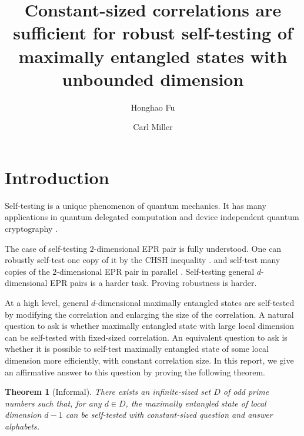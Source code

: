 \documentclass[11pt,letterpaper]{article}
\newcommand{\1}{\mathbb{1}}
\newtheorem{theorem}{Theorem}[section]
\theoremstyle{definition}
\begin{document}
\title{Constant-sized correlations are sufficient for 
robust self-testing of maximally entangled states with unbounded dimension}

\author[1]{Honghao Fu}
\author[1,2]{Carl Miller}

\renewcommand\Affilfont{\itshape\small}



\maketitle

\section{Introduction}
\label{sec:intro}
Self-testing is a unique phenomenon of quantum mechanics. It has many applications in quantum
delegated computation \cite{ruv2013,cgsv2017} and device independent quantum cryptography
\cite{qkd2011,qkd2014,miller2016,fu2018,eat2018}.

The case of self-testing $2$-dimensional EPR pair is fully understood. One can robustly self-test
one copy of it by the CHSH inequality \cite{bamps2015}. and self-test many copies of the $2$-dimensional EPR
pair in parallel \cite{mckague2016, coladan2017parallel}. 
Self-testing general $d$-dimensional EPR pairs is a harder task.
Proving robustness is harder.


At a high level, general $d$-dimensional maximally entangled states are self-tested by
modifying the correlation and enlarging the size of the correlation.
A natural question to ask is whether maximally entangled state with large local dimension
can be self-tested with fixed-sized correlation. 
An equivalent question to ask is whether it is possible to self-test maximally
entangled state of some local dimension more efficiently, with constant correlation size. 
In this report, we give an affirmative answer to this question by proving the following theorem.
\begin{theorem}[Informal]
\label{thm:inf}
	There exists an infinite-sized set $D$ of odd prime numbers such that, for any $d \in D$, 
	the maximally entangled state of local dimension $d-1$ can be self-tested 
	with constant-sized question and answer alphabets.
\end{theorem}
\end{document}
